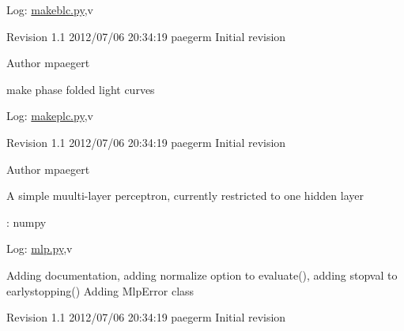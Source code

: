 \begin{DoxyParagraph}{Log:}
\hyperlink{makeblc_8py}{makeblc.py},v 
\end{DoxyParagraph}
Revision 1.1 2012/07/06 20:34:19 paegerm Initial revision

\begin{DoxyAuthor}{Author}
mpaegert 
\end{DoxyAuthor}
make phase folded light curves

\begin{DoxyParagraph}{Log:}
\hyperlink{makeplc_8py}{makeplc.py},v 
\end{DoxyParagraph}
Revision 1.1 2012/07/06 20:34:19 paegerm Initial revision

\begin{DoxyAuthor}{Author}
mpaegert 
\end{DoxyAuthor}
A simple muulti-\/layer perceptron, currently restricted to one hidden layer

: numpy

\begin{DoxyParagraph}{Log:}
\hyperlink{mlp_8py}{mlp.py},v 
\end{DoxyParagraph}
Adding documentation, adding normalize option to evaluate(), adding stopval to earlystopping() Adding MlpError class

Revision 1.1 2012/07/06 20:34:19 paegerm Initial revision 